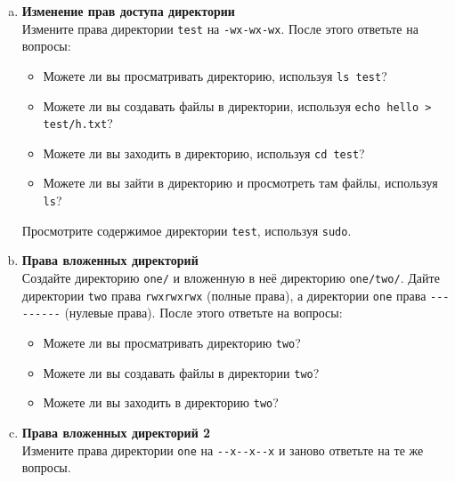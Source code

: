 \documentclass{article}
\begin{document}
\begin{enumerate}[a.]
\item \textbf{Изменение прав доступа директории}\\
Измените права директории \texttt{test} на \texttt{-wx-wx-wx}. После этого ответьте на вопросы:
\begin{itemize}
\item Можете ли вы просматривать директорию, используя \texttt{ls test}?
\item Можете ли вы создавать файлы в директории, используя \texttt{echo hello > test/h.txt}?
\item Можете ли вы заходить в директорию, используя \texttt{cd test}?
\item Можете ли вы зайти в директорию и просмотреть там файлы, используя \texttt{ls}?
\end{itemize}
Просмотрите содержимое директории \texttt{test}, используя \texttt{sudo}.

\item \textbf{Права вложенных директорий}\\
Создайте директорию \texttt{one/} и вложенную в неё директорию \texttt{one/two/}.
Дайте директории \texttt{two} права \texttt{rwxrwxrwx} (полные права), а директории \texttt{one} права \texttt{-{}-{}-{}-{}-{}-{}-{}-{}-} (нулевые права). После этого ответьте на вопросы:
\begin{itemize}
\item Можете ли вы просматривать директорию \texttt{two}?
\item Можете ли вы создавать файлы в директории \texttt{two}?
\item Можете ли вы заходить в директорию \texttt{two}?
\end{itemize}

\item \textbf{Права вложенных директорий 2}\\
Измените права директории \texttt{one} на \texttt{-{}-x-{}-x-{}-x} и заново ответьте на те же вопросы.

\end{enumerate}


\iffalse
\newpage
~
\newpage
\end{document}
